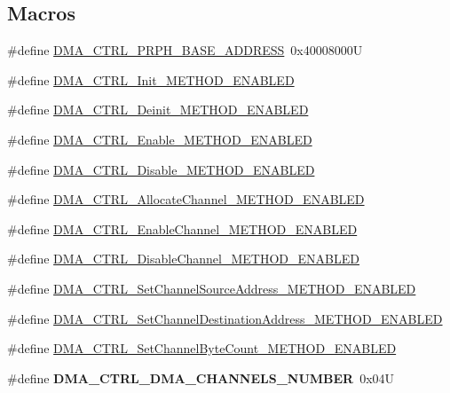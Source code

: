 \subsection*{Macros}
\begin{DoxyCompactItemize}
\item 
\#define \hyperlink{group___d_m_a___c_t_r_l__module_ga9feb00c7de6fd832b18a124b70ec57c4}{D\-M\-A\-\_\-\-C\-T\-R\-L\-\_\-\-P\-R\-P\-H\-\_\-\-B\-A\-S\-E\-\_\-\-A\-D\-D\-R\-E\-S\-S}~0x40008000\-U
\item 
\#define \hyperlink{group___d_m_a___c_t_r_l__module_ga52949fe4da2927d2008e13026fa1e05b}{D\-M\-A\-\_\-\-C\-T\-R\-L\-\_\-\-Init\-\_\-\-M\-E\-T\-H\-O\-D\-\_\-\-E\-N\-A\-B\-L\-E\-D}
\item 
\#define \hyperlink{group___d_m_a___c_t_r_l__module_ga08ff0cba74af3d362f918bf29ea0e24a}{D\-M\-A\-\_\-\-C\-T\-R\-L\-\_\-\-Deinit\-\_\-\-M\-E\-T\-H\-O\-D\-\_\-\-E\-N\-A\-B\-L\-E\-D}
\item 
\#define \hyperlink{group___d_m_a___c_t_r_l__module_ga09618214fd4e853b5d3569e475509c30}{D\-M\-A\-\_\-\-C\-T\-R\-L\-\_\-\-Enable\-\_\-\-M\-E\-T\-H\-O\-D\-\_\-\-E\-N\-A\-B\-L\-E\-D}
\item 
\#define \hyperlink{group___d_m_a___c_t_r_l__module_ga14d9474b48262b365e4422cac02c1f04}{D\-M\-A\-\_\-\-C\-T\-R\-L\-\_\-\-Disable\-\_\-\-M\-E\-T\-H\-O\-D\-\_\-\-E\-N\-A\-B\-L\-E\-D}
\item 
\#define \hyperlink{group___d_m_a___c_t_r_l__module_ga58553c5c3fcf6de625b22b6360dc68cd}{D\-M\-A\-\_\-\-C\-T\-R\-L\-\_\-\-Allocate\-Channel\-\_\-\-M\-E\-T\-H\-O\-D\-\_\-\-E\-N\-A\-B\-L\-E\-D}
\item 
\#define \hyperlink{group___d_m_a___c_t_r_l__module_ga8683b68326967d61cc3823367c935f36}{D\-M\-A\-\_\-\-C\-T\-R\-L\-\_\-\-Enable\-Channel\-\_\-\-M\-E\-T\-H\-O\-D\-\_\-\-E\-N\-A\-B\-L\-E\-D}
\item 
\#define \hyperlink{group___d_m_a___c_t_r_l__module_ga31575fe0bd44f2dadbe710e7ba0f549a}{D\-M\-A\-\_\-\-C\-T\-R\-L\-\_\-\-Disable\-Channel\-\_\-\-M\-E\-T\-H\-O\-D\-\_\-\-E\-N\-A\-B\-L\-E\-D}
\item 
\#define \hyperlink{group___d_m_a___c_t_r_l__module_gad0ff8434b75db68ebd7a137fed4eb0ac}{D\-M\-A\-\_\-\-C\-T\-R\-L\-\_\-\-Set\-Channel\-Source\-Address\-\_\-\-M\-E\-T\-H\-O\-D\-\_\-\-E\-N\-A\-B\-L\-E\-D}
\item 
\#define \hyperlink{group___d_m_a___c_t_r_l__module_ga7850ed9139222e998b6b45d32c8b4147}{D\-M\-A\-\_\-\-C\-T\-R\-L\-\_\-\-Set\-Channel\-Destination\-Address\-\_\-\-M\-E\-T\-H\-O\-D\-\_\-\-E\-N\-A\-B\-L\-E\-D}
\item 
\#define \hyperlink{group___d_m_a___c_t_r_l__module_gafe1968eaf17f93a96eec2bfc9ab566c7}{D\-M\-A\-\_\-\-C\-T\-R\-L\-\_\-\-Set\-Channel\-Byte\-Count\-\_\-\-M\-E\-T\-H\-O\-D\-\_\-\-E\-N\-A\-B\-L\-E\-D}
\item 
\hypertarget{group___d_m_a___c_t_r_l__module_ga11d1b436b6bd3056d25f1d64c7503200}{\#define {\bfseries D\-M\-A\-\_\-\-C\-T\-R\-L\-\_\-\-D\-M\-A\-\_\-\-C\-H\-A\-N\-N\-E\-L\-S\-\_\-\-N\-U\-M\-B\-E\-R}~0x04\-U}\label{group___d_m_a___c_t_r_l__module_ga11d1b436b6bd3056d25f1d64c7503200}


\end{DoxyCompactItemize}
